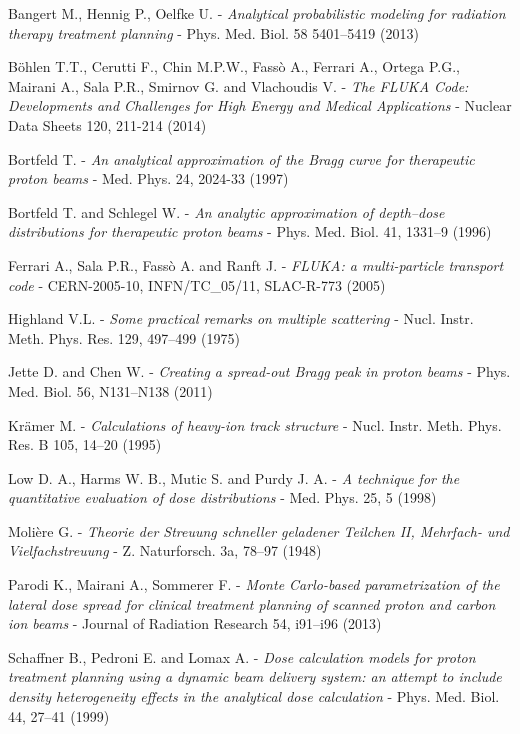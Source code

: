 \documentclass[12pt, a4paper, twoside]{book}
\begin{document}
\begin{thebibliography}{99}

Bangert M., Hennig P., Oelfke U. -
\emph{Analytical probabilistic modeling for radiation therapy treatment planning} - 
Phys. Med. Biol. 58 5401–5419 (2013)

Böhlen T.T., Cerutti F., Chin M.P.W., Fassò A., Ferrari  A., Ortega P.G., Mairani A., Sala P.R., Smirnov G. and Vlachoudis V. -
\emph{The FLUKA Code: Developments and Challenges for High Energy and Medical Applications} -
Nuclear Data Sheets 120, 211-214 (2014) 

Bortfeld T. -
\emph{An analytical approximation of the Bragg curve for therapeutic proton beams} -
Med. Phys. 24, 2024-33 (1997)

Bortfeld T. and Schlegel W. -
\emph{An analytic approximation of depth–dose distributions for therapeutic proton beams} -
Phys. Med. Biol. 41, 1331–9 (1996)

Ferrari A., Sala P.R., Fassò A. and Ranft J. -
\emph{FLUKA: a multi-particle transport code} -
CERN-2005-10, INFN/TC\_05/11, SLAC-R-773 (2005)

Highland V.L. -
\emph{Some practical remarks on multiple scattering} -
Nucl. Instr. Meth. Phys. Res. 129, 497–499 (1975)

Jette D. and Chen W. - 
\emph{Creating a spread-out Bragg peak in proton beams} -
Phys. Med. Biol. 56, N131–N138 (2011)

Krämer M. - 
\emph{Calculations of heavy-ion track structure} - 
Nucl. Instr. Meth. Phys. Res. B 105, 14–20 (1995)

Low D. A., Harms W. B., Mutic S. and Purdy J. A. -
\emph{A technique for the quantitative evaluation of dose distributions} -
Med. Phys. 25, 5 (1998)

Molière G. -
\emph{Theorie der Streuung schneller geladener Teilchen II, Mehrfach- und Vielfachstreuung} - 
Z. Naturforsch. 3a, 78–97 (1948)

Parodi K., Mairani A., Sommerer F. -
\emph{Monte Carlo-based parametrization of the lateral dose spread for clinical treatment planning of scanned proton and carbon ion beams} -
Journal of Radiation Research 54, i91–i96 (2013)

Schaffner B., Pedroni E. and Lomax A. -
\emph{Dose calculation models for proton treatment planning using a dynamic beam delivery system: an attempt to include density heterogeneity effects in the analytical dose calculation} - 
Phys. Med. Biol. 44, 27–41 (1999)


\end{thebibliography}
\end{document}
